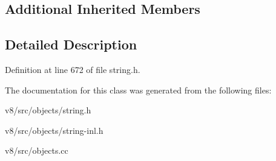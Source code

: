 \subsection*{Additional Inherited Members}


\subsection{Detailed Description}


Definition at line 672 of file string.\+h.



The documentation for this class was generated from the following files\+:\begin{DoxyCompactItemize}
\item 
v8/src/objects/string.\+h\item 
v8/src/objects/string-\/inl.\+h\item 
v8/src/objects.\+cc\end{DoxyCompactItemize}
